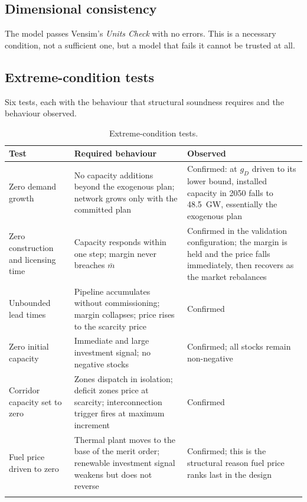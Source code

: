 \documentclass[11pt]{article}
\begin{document}
\subsection{Dimensional consistency}

The model passes Vensim's \emph{Units Check} with no errors. This is a necessary
condition, not a sufficient one, but a model that fails it cannot be trusted at all.

\subsection{Extreme-condition tests}

Six tests, each with the behaviour that structural soundness requires and the
behaviour observed.

\begin{longtable}{@{}p{3.6cm}p{5.3cm}p{5.3cm}@{}}
  \toprule
  Test & Required behaviour & Observed \\
  \midrule
  \endhead
  Zero demand growth & No capacity additions beyond the exogenous plan; network
    grows only with the committed plan & Confirmed: at $g_D$ driven to its lower
    bound, installed capacity in 2050 falls to \SI{48.5}{\giga\watt}, essentially
    the exogenous plan \\
  Zero construction and licensing time & Capacity responds within one step;
    margin never breaches $\bar m$ & Confirmed in the validation configuration;
    the margin is held and the price falls immediately, then recovers as the
    market rebalances \\
  Unbounded lead times & Pipeline accumulates without commissioning; margin
    collapses; price rises to the scarcity price & Confirmed \\
  Zero initial capacity & Immediate and large investment signal; no negative
    stocks & Confirmed; all stocks remain non-negative \\
  Corridor capacity set to zero & Zones dispatch in isolation; deficit zones price
    at scarcity; interconnection trigger fires at maximum increment & Confirmed \\
  Fuel price driven to zero & Thermal plant moves to the base of the merit order;
    renewable investment signal weakens but does not reverse & Confirmed; this is
    the structural reason fuel price ranks last in the design \\
  \bottomrule
  \caption{Extreme-condition tests.}
  \label{tab:sm:extreme}
\end{longtable}
\end{document}
